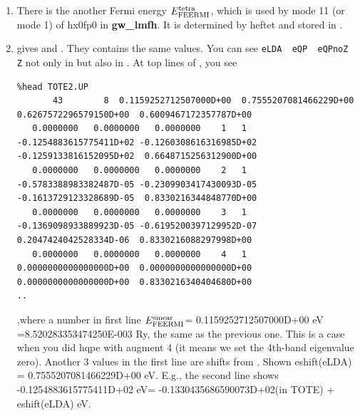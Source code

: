 {\begin{enumerate}
This is the head of ;
{\baselineskip=3mm \small
\begin{verbatim}
%head TOTE.UP
          43           8  8.520283353474250E-003
   0.0000000   0.0000000   0.0000000    1   1  -0.1330435686590073D+02 -0.1322984339282777D+02 -0.1319228487875673D+02  0.6648715256312900D+00
   0.0000000   0.0000000   0.0000000    2   1  -0.7555264915356062D+00 -0.6267595395613325D+00 -0.6009483309649021D+00  0.8330216344848770D+00
...
\end{verbatim}}

Here $E_{\rm FEERMI}^{\rm smear}$=8.520283353474250E-003. 
From the second lines, they are LDA eigenvalues and QP energies 
(Z included and Z=1); they are relative to the $E_{\rm FEERMI}^{\rm smear}$.\\
-13.18843159 eV - $E_{\rm FEERMI}^{\rm smear}$(which should be translated into in eV)  
= -0.1330435686590073D+02 eV.
Here -13.18843159 is the value in  shown above.


\item
There is the another Fermi energy $E_{\rm FEERMI}^{\rm tetra}$, 
which is used by mode 11 (or mode 1) of hx0fp0 in {\bf gw\_lmfh}.
It is determined by heftet and stored in .

\item
{} gives  and . 
They contains the same values. You can see  
\verb#eLDA  eQP  eQPnoZ  Z# not only in  but also in .
At top lines of , you see  
{\baselineskip=3mm \small
\begin{verbatim}
%head TOTE2.UP
       43        8  0.1159252712507000D+00  0.7555207081466229D+00  0.6267572296579150D+00  0.6009467172357787D+00
   0.0000000   0.0000000   0.0000000    1   1  -0.1254883615775411D+02 -0.1260308616316985D+02 -0.1259133816152095D+02  0.6648715256312900D+00
   0.0000000   0.0000000   0.0000000    2   1  -0.5783388983382487D-05 -0.2309903417430093D-05 -0.1613729123328689D-05  0.8330216344848770D+00
   0.0000000   0.0000000   0.0000000    3   1  -0.1369098933889923D-05 -0.6195200397129952D-07  0.2047424042528334D-06  0.8330216088297998D+00
   0.0000000   0.0000000   0.0000000    4   1   0.0000000000000000D+00  0.0000000000000000D+00  0.0000000000000000D+00  0.8330216340404680D+00
..
\end{verbatim}}
,where a number in first line $E_{\rm FEERMI}^{\rm smear}$= 
0.1159252712507000D+00 eV =8.520283353474250E-003 Ry,
the same as the previous one.
This is a case when you did hqpe with augment 4 
(it means we set the 4th-band eigenvalue zero).
Another 3 values in the first line are shifts from .
Shown eshift(eLDA) = 0.7555207081466229D+00 eV.
E.g., the second line shows\\
-0.1254883615775411D+02 eV= -0.1330435686590073D+02(in TOTE) + eshift(eLDA) eV.\\


\end{enumerate}}
